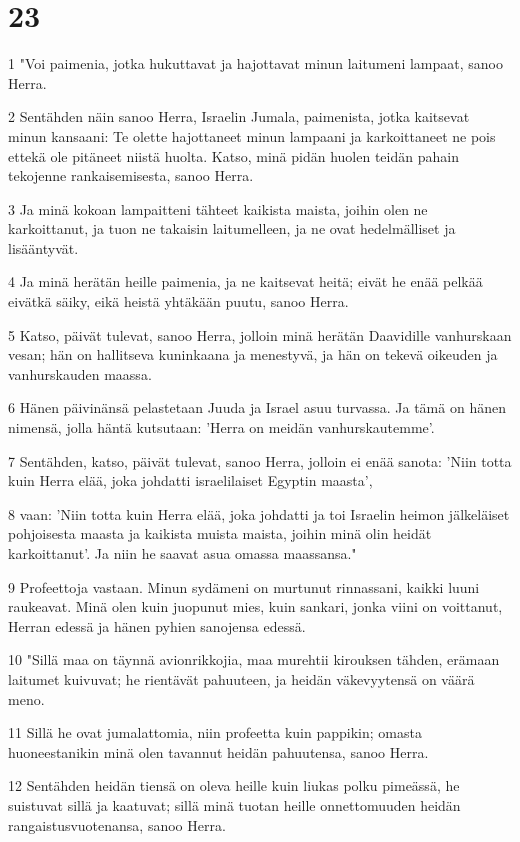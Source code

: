 \chapter{23}

\par 1 "Voi paimenia, jotka hukuttavat ja hajottavat minun laitumeni lampaat, sanoo Herra.
\par 2 Sentähden näin sanoo Herra, Israelin Jumala, paimenista, jotka kaitsevat minun kansaani: Te olette hajottaneet minun lampaani ja karkoittaneet ne pois ettekä ole pitäneet niistä huolta. Katso, minä pidän huolen teidän pahain tekojenne rankaisemisesta, sanoo Herra.
\par 3 Ja minä kokoan lampaitteni tähteet kaikista maista, joihin olen ne karkoittanut, ja tuon ne takaisin laitumelleen, ja ne ovat hedelmälliset ja lisääntyvät.
\par 4 Ja minä herätän heille paimenia, ja ne kaitsevat heitä; eivät he enää pelkää eivätkä säiky, eikä heistä yhtäkään puutu, sanoo Herra.
\par 5 Katso, päivät tulevat, sanoo Herra, jolloin minä herätän Daavidille vanhurskaan vesan; hän on hallitseva kuninkaana ja menestyvä, ja hän on tekevä oikeuden ja vanhurskauden maassa.
\par 6 Hänen päivinänsä pelastetaan Juuda ja Israel asuu turvassa. Ja tämä on hänen nimensä, jolla häntä kutsutaan: 'Herra on meidän vanhurskautemme'.
\par 7 Sentähden, katso, päivät tulevat, sanoo Herra, jolloin ei enää sanota: 'Niin totta kuin Herra elää, joka johdatti israelilaiset Egyptin maasta',
\par 8 vaan: 'Niin totta kuin Herra elää, joka johdatti ja toi Israelin heimon jälkeläiset pohjoisesta maasta ja kaikista muista maista, joihin minä olin heidät karkoittanut'. Ja niin he saavat asua omassa maassansa."
\par 9 Profeettoja vastaan. Minun sydämeni on murtunut rinnassani, kaikki luuni raukeavat. Minä olen kuin juopunut mies, kuin sankari, jonka viini on voittanut, Herran edessä ja hänen pyhien sanojensa edessä.
\par 10 "Sillä maa on täynnä avionrikkojia, maa murehtii kirouksen tähden, erämaan laitumet kuivuvat; he rientävät pahuuteen, ja heidän väkevyytensä on väärä meno.
\par 11 Sillä he ovat jumalattomia, niin profeetta kuin pappikin; omasta huoneestanikin minä olen tavannut heidän pahuutensa, sanoo Herra.
\par 12 Sentähden heidän tiensä on oleva heille kuin liukas polku pimeässä, he suistuvat sillä ja kaatuvat; sillä minä tuotan heille onnettomuuden heidän rangaistusvuotenansa, sanoo Herra.
